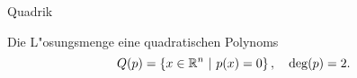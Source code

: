 \documentclass[class=article, crop=false]{standalone}
\begin{document}
\begin{zettel}{Quadrik}
\begin{flashcard}[]{}
	\begin{definition}
		Die L"osungsmenge eine quadratischen Polynoms
		\[
			Q(p)= \set{x \in  \R^n}{p(x) = 0}, \quad \deg(p)= 2
		.\]
	\end{definition}
\end{flashcard}
\end{zettel}
\end{document}
